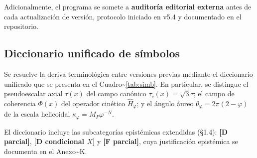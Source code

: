 ﻿\documentclass[11pt,letterpaper]{article}
\begin{document}
Adicionalmente, el programa se somete a \textbf{auditoría editorial externa} antes de cada actualización de versión, protocolo iniciado en v5.4 y documentado en el repositorio.
\subsection{Diccionario unificado de símbolos}
Se resuelve la deriva terminológica entre versiones previas mediante el diccionario unificado que se presenta en el Cuadro\textasciitilde{}\ref{tab:simb}. En particular, se distingue el pseudoescalar axial $\tau(x)$ del campo canónico $\tau_c(x) = \sqrt{3}\tau$; el campo de coherencia $\Phi(x)$ del operador cinético $\hat{H}_\varphi$; y el ángulo áureo $\theta_\varphi = 2\pi(2-\varphi)$ de la escala helicoidal $\kappa_\varphi = M_P \varphi^{-N}$.

El diccionario incluye las subcategorías epistémicas extendidas (§1.4): \textbf{[D parcial]}, \textbf{[D condicional $X$]} y \textbf{[F parcial]}, cuya justificación epistémica se documenta en el Anexo\textasciitilde{}K.

\begin{table}[htbp]
  \centering
  \small
  \caption{Diccionario unificado de símbolos (tesis v5.4).}
  \label{tab:simb}
\end{table}
\end{document}
